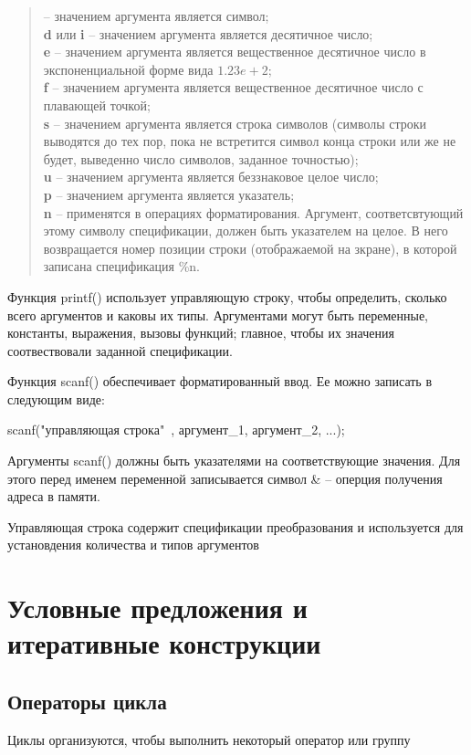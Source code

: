\documentclass[a4paper, fontsize=10bp]{article} %
\begin{document}
\begin{quotation}
    
     -- значением аргумента является символ;
\\
    {\textbf d} или {\textbf i} -- значением аргумента является десятичное число;
\\
    {\textbf e} -- значением аргумента является вещественное десятичное число в экспоненциальной форме вида
    $1.23e+2$;
\\
    {\textbf f} -- значением аргумента является вещественное десятичное число с плавающей точкой;
\\
    {\textbf s} -- значением аргумента является строка символов (символы строки выводятся до тех пор, пока не 
                    встретится символ конца строки или же не будет, выведенно число символов, заданное точностью);
\\
    {\textbf u} -- значением аргумента является беззнаковое целое число;
\\
    {\textbf p} -- значением аргумента является указатель;
\\
    {\textbf n} -- применятся в операциях форматирования. Аргумент, соответсвтующий этому символу
                    спецификации, должен быть указателем на целое. В него возвращается номер позиции строки
                    (отображаемой на зкране), в которой записана спецификация \%n.

\end{quotation}

Функция printf() использует управляющую строку, чтобы определить, сколько всего аргументов и каковы
их типы. Аргументами могут быть переменные, константы, выражения, вызовы функций; главное, чтобы их
значения соотвествовали заданной спецификации.

\noindent Функция scanf() обеспечивает форматированный ввод. Ее можно записать в следующим виде:

scanf("управляющая строка"\ , аргумент\_1, аргумент\_2, ...);

\noindent Аргументы scanf() должны быть указателями на соответствующие значения. Для этого перед именем
переменной записывается символ \& -- оперция получения адреса в памяти.

\noindent Управляющая строка содержит спецификации преобразования и используется для установдения количества
и типов аргументов


\section{Условные предложения и итеративные конструкции}

\subsection*{Операторы цикла}

\indent Циклы организуются, чтобы выполнить некоторый оператор или группу
\end{document}
